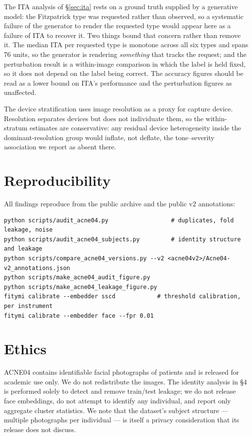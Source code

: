 \documentclass[11pt]{article}
\begin{document}
The ITA analysis of \S\ref{sec:ita} rests on a ground truth supplied by a generative model:
the Fitzpatrick type was requested rather than observed, so a systematic failure of the
generator to render the requested type would appear here as a failure of ITA to recover it.
Two things bound that concern rather than remove it. The median ITA per requested type is
monotone across all six types and spans 76 units, so the generator is rendering
\emph{something} that tracks the request; and the perturbation result is a within-image
comparison in which the label is held fixed, so it does not depend on the label being
correct. The accuracy figures should be read as a lower bound on ITA's performance and the
perturbation figures as unaffected.

The device stratification uses image resolution as a proxy for capture device. Resolution
separates devices but does not individuate them, so the within-stratum estimates are
conservative: any residual device heterogeneity inside the dominant-resolution group would
inflate, not deflate, the tone--severity association we report as absent there.

\section{Reproducibility}

All findings reproduce from the public archive and the public v2 annotations:

\begin{verbatim}
python scripts/audit_acne04.py                  # duplicates, fold leakage, noise
python scripts/audit_acne04_subjects.py         # identity structure and leakage
python scripts/compare_acne04_versions.py --v2 <acne04v2>/Acne04-v2_annotations.json
python scripts/make_acne04_audit_figure.py
python scripts/make_acne04_leakage_figure.py
fitymi calibrate --embedder sscd            # threshold calibration, per instrument
fitymi calibrate --embedder face --fpr 0.01
\end{verbatim}

\section*{Ethics}
ACNE04 contains identifiable facial photographs of patients and is released for academic
use only. We do not redistribute the images. The identity analysis in \S4 is performed
solely to detect and remove train/test leakage; we do not release face embeddings, do not
attempt to identify any individual, and report only aggregate cluster statistics. We note
that the dataset's subject structure --- multiple photographs per individual --- is
itself a privacy consideration that its release does not discuss.



\end{document}

